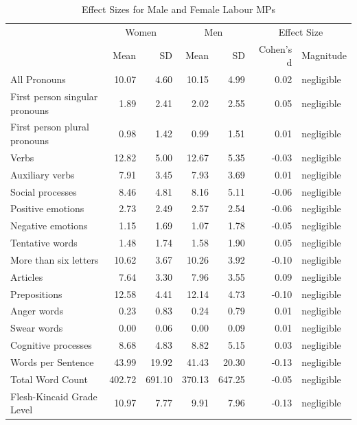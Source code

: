 \documentclass[]{article}
\theoremstyle{definition}
\theoremstyle{definition}
\theoremstyle{definition}
\theoremstyle{remark}
\begin{document}
\begin{table}[H]
\begin{table}[H]
\begin{table}[H]
\begin{table}
\caption{\label{tab:gender-effect-sizes-table}Effect Sizes for Male and Female Labour MPs}
\centering
\begin{tabular}[t]{lrrrrrl}
\toprule
\multicolumn{1}{c}{ } & \multicolumn{2}{c}{Women} & \multicolumn{2}{c}{Men} & \multicolumn{2}{c}{Effect Size} \\
\cmidrule(l{2pt}r{2pt}){2-3} \cmidrule(l{2pt}r{2pt}){4-5} \cmidrule(l{2pt}r{2pt}){6-7}
 & Mean & SD & Mean & SD & Cohen's d & Magnitude\\
\midrule
All Pronouns & 10.07 & 4.60 & 10.15 & 4.99 & 0.02 & negligible\\
First person singular pronouns & 1.89 & 2.41 & 2.02 & 2.55 & 0.05 & negligible\\
First person plural pronouns & 0.98 & 1.42 & 0.99 & 1.51 & 0.01 & negligible\\
Verbs & 12.82 & 5.00 & 12.67 & 5.35 & -0.03 & negligible\\
Auxiliary verbs & 7.91 & 3.45 & 7.93 & 3.69 & 0.01 & negligible\\
\addlinespace
Social processes & 8.46 & 4.81 & 8.16 & 5.11 & -0.06 & negligible\\
Positive emotions & 2.73 & 2.49 & 2.57 & 2.54 & -0.06 & negligible\\
Negative emotions & 1.15 & 1.69 & 1.07 & 1.78 & -0.05 & negligible\\
Tentative words & 1.48 & 1.74 & 1.58 & 1.90 & 0.05 & negligible\\
More than six letters & 10.62 & 3.67 & 10.26 & 3.92 & -0.10 & negligible\\
\addlinespace
Articles & 7.64 & 3.30 & 7.96 & 3.55 & 0.09 & negligible\\
Prepositions & 12.58 & 4.41 & 12.14 & 4.73 & -0.10 & negligible\\
Anger words & 0.23 & 0.83 & 0.24 & 0.79 & 0.01 & negligible\\
Swear words & 0.00 & 0.06 & 0.00 & 0.09 & 0.01 & negligible\\
Cognitive processes & 8.68 & 4.83 & 8.82 & 5.15 & 0.03 & negligible\\
\addlinespace
Words per Sentence & 43.99 & 19.92 & 41.43 & 20.30 & -0.13 & negligible\\
Total Word Count & 402.72 & 691.10 & 370.13 & 647.25 & -0.05 & negligible\\
Flesh-Kincaid Grade Level & 10.97 & 7.77 & 9.91 & 7.96 & -0.13 & negligible\\
\bottomrule
\end{tabular}
\end{table}


\end{table}
\end{table}
\end{table}
\end{document}
